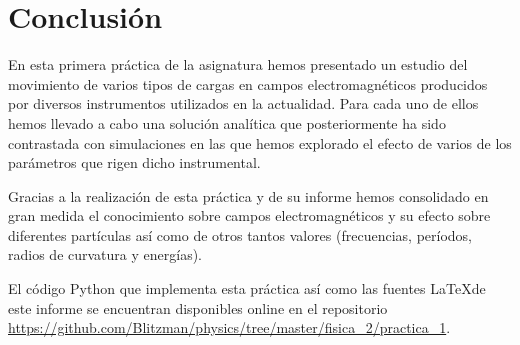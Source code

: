 \documentclass[journal]{IEEEtran}
\begin{document}
\section{Conclusión}
\label{sec:conclusion}
En esta primera práctica de la asignatura hemos presentado un estudio del movimiento de varios tipos de cargas en campos electromagnéticos producidos por diversos instrumentos utilizados en la actualidad. Para cada uno de ellos hemos llevado a cabo una solución analítica que posteriormente ha sido contrastada con simulaciones en las que hemos explorado el efecto de varios de los parámetros que rigen dicho instrumental.

Gracias a la realización de esta práctica y de su informe hemos consolidado en gran medida el conocimiento sobre campos electromagnéticos y su efecto sobre diferentes partículas así como de otros tantos valores (frecuencias, períodos, radios de curvatura y energías).

\clearpage

El código Python que implementa esta práctica así como las fuentes \LaTeX de este informe se encuentran disponibles online en el repositorio \url{https://github.com/Blitzman/physics/tree/master/fisica_2/practica_1}.
\end{document}
